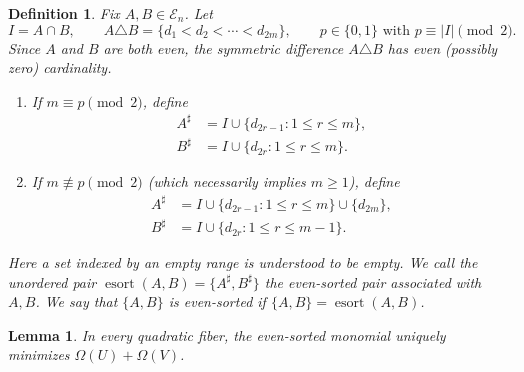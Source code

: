 \documentclass[10pt,a4paper]{amsart}
\newtheorem{definition}{Definition}
\newtheorem{lemma}{Lemma}
\newcommand{\En}{\mathcal E_n}
\newcommand{\esort}{\operatorname{esort}}
\begin{document}
\begin{definition} \label{def:evensort}
Fix $A,B\in\En$. 
Let
\[
I=A\cap B,
 \qquad
A\triangle B=\{d_1<d_2<\cdots<d_{2m}\},
 \qquad
p\in\{0,1\} \mbox{ with } p\equiv |I|\pmod2.
\]
Since $A$ and $B$ are both even,
the symmetric difference $A \triangle B$ has even (possibly zero) cardinality.
\begin{enumerate}
    \item 
If $m\equiv p\pmod2$, define
\begin{align*}
 A^\sharp&=I\cup\{d_{2r-1}:1\le r\le m\},\\
 B^\sharp&=I\cup\{d_{2r}:1\le r\le m\}.
\end{align*}
\item
If $m\not\equiv p\pmod2$ (which necessarily implies $m\ge1$), define
\begin{align*}
 A^\sharp&=I\cup\{d_{2r-1}:1\le r\le m\}\cup\{d_{2m}\},\\
 B^\sharp&=I\cup\{d_{2r}:1\le r\le m-1\}.
\end{align*}
\end{enumerate}
Here a set indexed by an empty range is understood to be empty. We call the unordered pair $\esort(A,B)=\{A^\sharp,B^\sharp\}$ the \emph{even-sorted pair} associated with $A,B$. We say that $\{A,B\}$ is even-sorted if $\{A,B\}=\esort(A,B)$.
\end{definition}

\begin{lemma}\label{lem:quadraticminimum}
In every quadratic fiber, the even-sorted monomial uniquely minimizes $\Omega(U)+\Omega(V)$.
\end{lemma}
\end{document}
